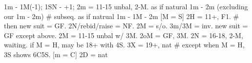 1m - 1M(-1); 1SN - +1;
2m = 11-15 unbal, 2-M. as if natural 1m - 2m (excluding our 1m - 2m)
    # subseq. as if natrual 1m - 1M - 2m
    [M = S] 2H = 11+, F1.  # then new suit = GF. 2N/rebid/raise = NF.
    2M = s/o. 3m/3M = inv. new suit = GF except above.
2M = 11-15 unbal w/ 3M.
2oM = GF, 3M.
2N = 16-18, 2-M, waiting. if M = H, may be 18+ with 4S.
3X = 19+, nat  # except when M = H, 3S shows 6C5S.
[m = C] 2D = nat
